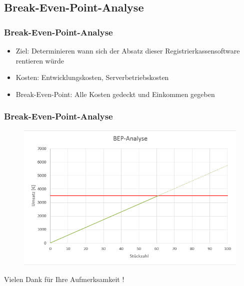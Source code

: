 \documentclass[12pt]{beamer}
\begin{document}
\subsection{Break-Even-Point-Analyse}
\begin{frame}
\frametitle{Break-Even-Point-Analyse}
\begin{itemize}
\item Ziel: Determinieren wann sich der Absatz dieser Registrierkassensoftware rentieren würde
\item Kosten: Entwicklungskosten, Serverbetriebskosten
\item Break-Even-Point: Alle Kosten gedeckt und Einkommen gegeben
\end{itemize}
\end{frame}
\begin{frame}
\frametitle{Break-Even-Point-Analyse}
\begin{figure}
\includegraphics[scale=0.45]{Bilder/BEP}
\end{figure}
\end{frame}

\begin{frame}
	\begin{Large}
		\begin{center}
				Vielen Dank für Ihre Aufmerksamkeit !
		\end{center}
	\end{Large}
\end{frame}
\end{document}
